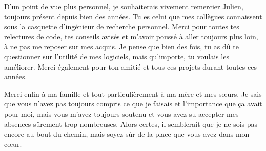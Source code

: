 \documentclass[english,a4paper,11pt,twoside]{StyleThese}
\begin{document}
D'un point de vue plus personnel, je souhaiterais vivement remercier Julien, toujours présent depuis bien des années. Tu es celui que mes collègues connaissent sous la casquette d'ingénieur de recherche personnel. Merci pour toutes tes relectures de code, tes conseils avisés et m'avoir poussé à aller toujours plus loin, à ne pas me reposer sur mes acquis. Je pense que bien des fois, tu as dû te questionner sur l'utilité de mes logiciels, mais qu'importe, tu voulais les améliorer. Merci également pour ton amitié et tous ces projets durant toutes ces années.

Merci enfin à ma famille et tout particulièrement à ma mère et mes sœurs. Je sais que vous n'avez pas toujours compris ce que je faisais et l'importance que ça avait pour moi, mais vous m'avez toujours soutenu et vous avez su accepter mes absences sûrement trop nombreuses. Alors certes, il semblerait que je ne sois pas encore au bout du chemin, mais soyez sûr de la place que vous avez dans mon cœur.

\tableofcontents

\printnoidxglossary[type=\acronymtype]
%

\mainmatter


%












\appendix



%



%

\end{document}
